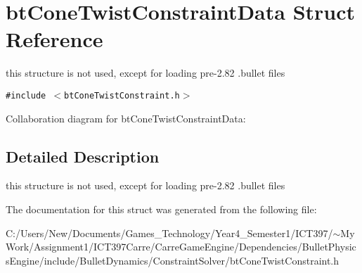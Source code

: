\hypertarget{structbt_cone_twist_constraint_data}{
\section{btConeTwistConstraintData Struct Reference}
\label{structbt_cone_twist_constraint_data}
}
this structure is not used, except for loading pre-2.82 .bullet files  


{\tt \#include $<$btConeTwistConstraint.h$>$}

Collaboration diagram for btConeTwistConstraintData:

\subsection{Detailed Description}
this structure is not used, except for loading pre-2.82 .bullet files 

The documentation for this struct was generated from the following file:\begin{CompactItemize}
\item 
C:/Users/New/Documents/Games\_\-Technology/Year4\_\-Semester1/ICT397/$\sim$My Work/Assignment1/ICT397Carre/CarreGameEngine/Dependencies/BulletPhysicsEngine/include/BulletDynamics/ConstraintSolver/btConeTwistConstraint.h\end{CompactItemize}
